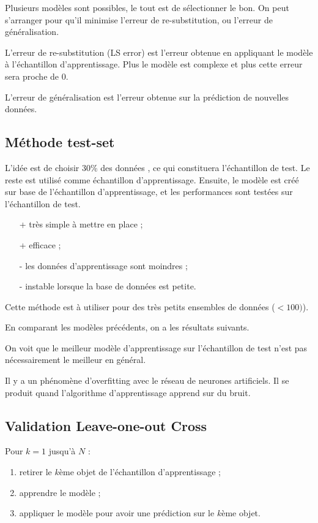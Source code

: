 Plusieurs modèles sont possibles, le tout est de sélectionner le bon. On peut s'arranger pour qu'il minimise l'erreur de re-substitution, ou l'erreur de généralisation.

L'erreur de re-substitution (LS error) est l'erreur obtenue en appliquant le modèle à l'échantillon d'apprentissage. Plus le modèle est complexe et plus cette erreur sera proche de 0.

L'erreur de généralisation est l'erreur obtenue sur la prédiction de nouvelles données.

\subsection{Méthode test-set}

L'idée est de choisir 30\% des données , ce qui constituera l'échantillon de test. Le reste est utilisé comme échantillon d'apprentissage. Ensuite, le modèle est créé sur base de l'échantillon d'apprentissage, et les performances sont testées sur l'échantillon de test.

\begin{itemize}
	\item[+] très simple à mettre en place ;
	\item[+] efficace ;
	\item[-] les données d'apprentissage sont moindres ;
	\item[-] instable lorsque la base de données est petite.
\end{itemize}

Cette méthode est à utiliser pour des très petits ensembles de données ($< 100)$).

En comparant les modèles précédents, on a les résultats suivants.


On voit que le meilleur modèle d'apprentissage sur l'échantillon de test n'est pas nécessairement le meilleur en général.

Il y a un phénomène d'overfitting avec le réseau de neurones artificiels. Il se produit quand l'algorithme d'apprentissage apprend sur du bruit.

\subsection{Validation Leave-one-out Cross}

Pour $k = 1$ jusqu'à $N$ :

\begin{enumerate}
	\item retirer le $k$ème objet de l'échantillon d'apprentissage ;
	\item apprendre le modèle ;
	\item appliquer le modèle pour avoir une prédiction sur le $k$ème objet.
\end{enumerate}

